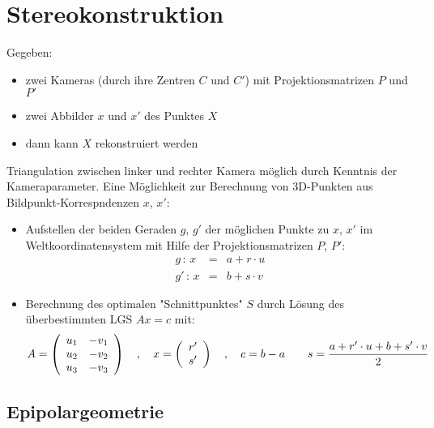 \section{Stereokonstruktion}

Gegeben:
\begin{itemize}
\item zwei Kameras (durch ihre Zentren $C$ und $C'$) mit Projektionsmatrizen $P$ und $P'$
\item zwei Abbilder $x$ und $x'$ des Punktes $X$
\item dann kann $X$ rekonstruiert werden
\end{itemize}
Triangulation zwischen linker und rechter Kamera möglich durch Kenntnis der Kameraparameter. Eine Möglichkeit zur Berechnung von 3D-Punkten aus Bildpunkt-Korrespndenzen $x$, $x'$:
\begin{itemize}
\item Aufstellen der beiden Geraden $g$, $g'$ der möglichen Punkte zu $x$, $x'$ im Weltkoordinatensystem mit Hilfe der Projektionsmatrizen $P$, $P'$:
\begin{eqnarray*}
g \, : \, x &=& a + r \cdot u \\ g' \, : \, x &=& b + s \cdot v
\end{eqnarray*}
\item Berechnung des optimalen "{}Schnittpunktes"{} $S$ durch Lösung des überbestimmten LGS $Ax = c$ mit: $$A = \left( \begin{array}{cc} u_1 & -v_1 \\ u_2 & -v_2 \\ u_3 & -v_3 \end{array} \right) \quad , \quad x = \left( \begin{array}{c} r' \\ s' \end{array} \right) \quad , \quad c = b-a \qquad s = \frac{a + r' \cdot u + b + s' \cdot v}{2}$$
\end{itemize}


\subsection{Epipolargeometrie}


